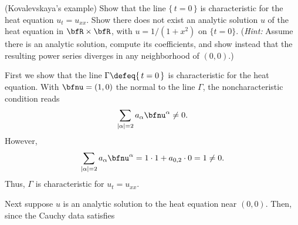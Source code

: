 \begin{problem}
  (Kovalevskaya's example) Show that the line \(\{\,t=0\,\}\) is
  characteristic for the heat equation \(u_t=u_{xx}\). Show there does not
  exist an analytic solution \(u\) of the heat equation in
  \(\bfR\times\bfR\), with \(u=1/(1+x^2)\) on \(\{t=0\}\). (\emph{Hint:}
  Assume there is an analytic solution, compute its coefficients, and show
  instead that the resulting power series diverges in any neighborhood of
  \((0,0)\).)
\end{problem}
\begin{solution}
  First we show that the line \(\Gamma\defeq\{\,t=0\,\}\) is characteristic
  for the heat equation. With \(\bfnu=(1,0)\) the normal to the line
  \(\Gamma\), the noncharacteristic condition reads
  \[
    \sum_{|\alpha|=2} a_\alpha\bfnu^\alpha\neq 0.
  \]
  However,
  \[
    \sum_{|\alpha|=2} a_\alpha\bfnu^\alpha=%
    1\cdot 1+a_{0,2}\cdot 0=%
    1\neq%
    0.
  \]
  Thus, \(\Gamma\) is characteristic for \(u_t=u_{xx}\).

  Next suppose \(u\) is an analytic solution to the heat equation near
  \((0,0)\). Then, since the Cauchy data satisfies
\end{solution}

